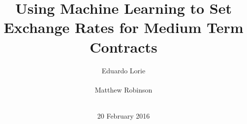 \documentclass{sig-alternate-05-2015}
\begin{document}


\title{{Using Machine Learning to Set Exchange Rates for Medium Term Contracts}
}
\author{
\alignauthor
Eduardo Lorie\\
       \\
\alignauthor 
Matthew Robinson \\
       \\
}

\date{20 February 2016}

\maketitle
\end{document}
